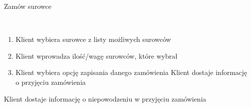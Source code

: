 	\begin{usecase}{Zamów surowce}
		\author{Dawid Suder}
		 \\
		\maketitle
		\begin{scenario}
			\begin{enumerate}
				\item Klient wybiera surowce z listy możliwych surowców
				\item Klient wprowadza ilość/wagę surowców, które wybrał
				\item Klient wybiera opcję zapisania danego zamówienia
				 Klient dostaje informację o przyjęciu zamówienia
			\end{enumerate}
		\end{scenario}
		\begin{extensions}
			\begin{enumerate}
				 Klient dostaje informację o niepowodzeniu w przyjęciu zamówienia
			\end{enumerate}
		\end{extensions}
	\end{usecase}

